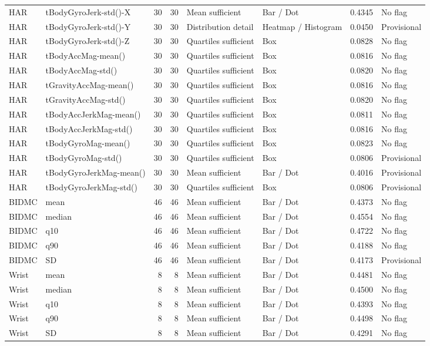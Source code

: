 \begin{longtable}{>{\raggedright\arraybackslash}p{2.5cm}>{\raggedright\arraybackslash}p{4.5cm}rr>{\raggedright\arraybackslash}p{3.0cm}>{\raggedright\arraybackslash}p{4.0cm}rp{2.0cm}}
HAR\cite{har} & tBodyGyroJerk-std()-X & 30 & 30 & Mean sufficient & Bar / Dot & 0.4345 & No flag\\
HAR\cite{har} & tBodyGyroJerk-std()-Y & 30 & 30 & Distribution detail & Heatmap / Histogram & 0.0450 & Provisional\\
HAR\cite{har} & tBodyGyroJerk-std()-Z & 30 & 30 & Quartiles sufficient & Box & 0.0828 & No flag\\
HAR\cite{har} & tBodyAccMag-mean() & 30 & 30 & Quartiles sufficient & Box & 0.0816 & No flag\\
HAR\cite{har} & tBodyAccMag-std() & 30 & 30 & Quartiles sufficient & Box & 0.0820 & No flag\\
HAR\cite{har} & tGravityAccMag-mean() & 30 & 30 & Quartiles sufficient & Box & 0.0816 & No flag\\
HAR\cite{har} & tGravityAccMag-std() & 30 & 30 & Quartiles sufficient & Box & 0.0820 & No flag\\
HAR\cite{har} & tBodyAccJerkMag-mean() & 30 & 30 & Quartiles sufficient & Box & 0.0811 & No flag\\
HAR\cite{har} & tBodyAccJerkMag-std() & 30 & 30 & Quartiles sufficient & Box & 0.0816 & No flag\\
HAR\cite{har} & tBodyGyroMag-mean() & 30 & 30 & Quartiles sufficient & Box & 0.0823 & No flag\\
HAR\cite{har} & tBodyGyroMag-std() & 30 & 30 & Quartiles sufficient & Box & 0.0806 & Provisional\\
HAR\cite{har} & tBodyGyroJerkMag-mean() & 30 & 30 & Mean sufficient & Bar / Dot & 0.4016 & Provisional\\
HAR\cite{har} & tBodyGyroJerkMag-std() & 30 & 30 & Quartiles sufficient & Box & 0.0806 & Provisional\\
BIDMC\cite{bidmc} & mean & 46 & 46 & Mean sufficient & Bar / Dot & 0.4373 & No flag\\
BIDMC\cite{bidmc} & median & 46 & 46 & Mean sufficient & Bar / Dot & 0.4554 & No flag\\
BIDMC\cite{bidmc} & q10 & 46 & 46 & Mean sufficient & Bar / Dot & 0.4722 & No flag\\
BIDMC\cite{bidmc} & q90 & 46 & 46 & Mean sufficient & Bar / Dot & 0.4188 & No flag\\
BIDMC\cite{bidmc} & SD & 46 & 46 & Mean sufficient & Bar / Dot & 0.4173 & Provisional\\
Wrist\cite{wrist} & mean & 8 & 8 & Mean sufficient & Bar / Dot & 0.4481 & No flag\\
Wrist\cite{wrist} & median & 8 & 8 & Mean sufficient & Bar / Dot & 0.4500 & No flag\\
Wrist\cite{wrist} & q10 & 8 & 8 & Mean sufficient & Bar / Dot & 0.4393 & No flag\\
Wrist\cite{wrist} & q90 & 8 & 8 & Mean sufficient & Bar / Dot & 0.4498 & No flag\\
Wrist\cite{wrist} & SD & 8 & 8 & Mean sufficient & Bar / Dot & 0.4291 & No flag\\
\bottomrule\end{longtable}